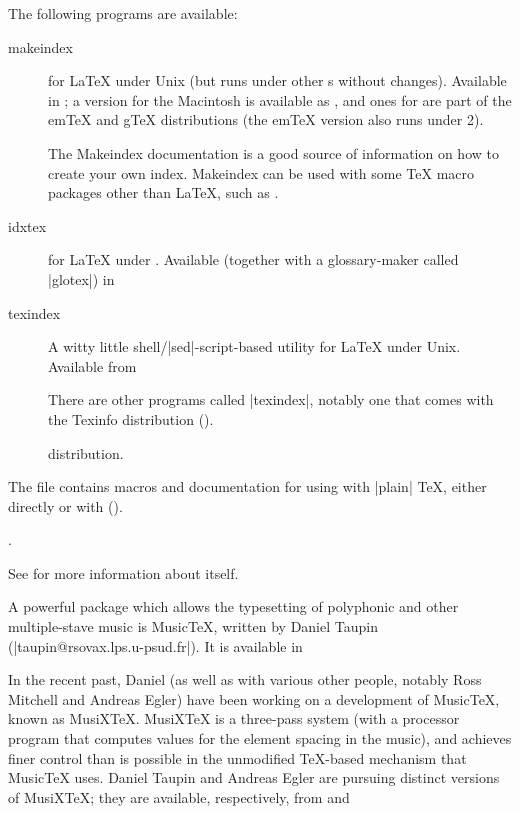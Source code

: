 The following programs are available:
\begin{description}
\item[makeindex] for \LaTeX{} under Unix (but runs under other s
  without changes).  Available in ; a version for
  the Macintosh is available as , and ones for
  \MSDOS{} are part of the em\TeX{} and g\TeX{} distributions (the
  em\TeX{} version also runs under 2).

  The Makeindex documentation is a good source of information on how
  to create your own index. Makeindex can be used with some \TeX{}
  macro packages other than \LaTeX{}, such as \Eplain{}.
\item[idxtex] for \LaTeX{} under .  Available (together with a
  glossary-maker called |glotex|) in 
\item[texindex] A witty little shell/\ProgName|sed|-script-based
  utility for \LaTeX{} under Unix.  Available from 

  There are other programs called \ProgName|texindex|, notably
  one that comes with the
\htmlignore
  Texinfo distribution ().
\endhtmlignore
\begin{htmlversion}
   distribution.
\end{htmlversion}
\end{description}


The file  contains macros and documentation
for using \BibTeX{} with |plain| \TeX{}, either directly or with
\htmlignore
\Eplain{} ().
\endhtmlignore
\begin{htmlversion}
.
\end{htmlversion}
See  for more
information about \BibTeX{} itself.


A powerful package which allows the typesetting of
polyphonic and other multiple-stave music is Music\TeX{}, written by
Daniel Taupin 
(\Email|taupin@rsovax.lps.u-psud.fr|). It is available 
in 

In the recent past, Daniel (as well as with various other people,
notably Ross Mitchell and Andreas Egler) have been working on a development of
Music\TeX{}, known as MusiX\TeX{}.  MusiX\TeX{} is a three-pass
system (with a processor program that computes values for the element
spacing in the music), and achieves finer control than is possible in
the unmodified \TeX{}-based mechanism that Music\TeX{} uses.  Daniel
Taupin and Andreas Egler are pursuing distinct versions of
MusiX\TeX{}; they are available, respectively, from
 and 

